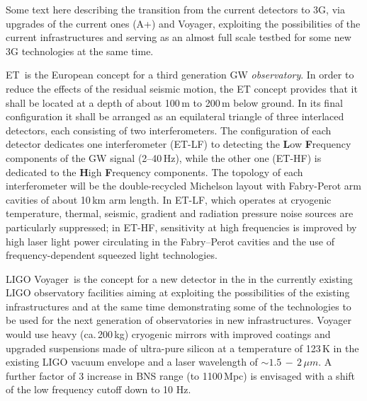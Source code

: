 Some text here describing the transition from the current detectors to 3G, via upgrades of the current ones (A+) and Voyager, exploiting the possibilities of the current infrastructures and serving as an almost full scale testbed for some new 3G technologies at the same time.

\begin{tcolorbox}[standard jigsaw,colback=amber!10!white,colframe=red!70!black,coltext=black, title=The Einstein gravitational--wave Telescope (ET)] ET\,\cite{ET2011} is the European concept for a third generation GW \emph{observatory}. In order to reduce the effects of the residual seismic motion, the ET concept provides that it shall be located at a depth of about 100\,m to 200\,m below ground. In its final configuration it shall be arranged as an equilateral triangle of three interlaced detectors, each consisting of two interferometers. The configuration of each detector dedicates one interferometer (ET-LF) to detecting the \textbf{L}ow \textbf{F}requency components of the GW signal (2--40\,Hz), while the other one (ET-HF) is dedicated to the \textbf{H}igh \textbf{F}requency components. The topology of each interferometer will be the double-recycled Michelson layout with Fabry-Perot arm cavities of about 10\,km arm length. In ET-LF, which operates at cryogenic temperature, thermal, seismic, gradient and radiation pressure noise sources are particularly suppressed; in ET-HF, sensitivity at high frequencies is improved by high laser light power circulating in the Fabry--Perot cavities and the use of frequency-dependent squeezed light technologies.
\end{tcolorbox}



\begin{tcolorbox}[standard jigsaw,colframe=azure!70!black,colback=azure!20!white,opacityback=0.6,coltext=black, title= LIGO Voyager]
LIGO Voyager\,\cite{Voyager:Inst,VoyagerDCC2018} is the concept for a new detector in the in the currently existing LIGO observatory facilities aiming at exploiting the possibilities of the existing infrastructures and at the same time demonstrating some of the technologies to be used for the next generation of observatories in new infrastructures.
Voyager would use heavy (ca.\,200\,kg) cryogenic mirrors with improved coatings and upgraded suspensions made of ultra-pure silicon at a temperature of 123\,K in the existing LIGO vacuum envelope and a laser wavelength of $\sim1.5\,-\,2\,\mu m$. 
A further factor of 3 increase in BNS range (to 1100\,Mpc) is envisaged with a shift of the low frequency cutoff down to 10 Hz.
\end{tcolorbox}

